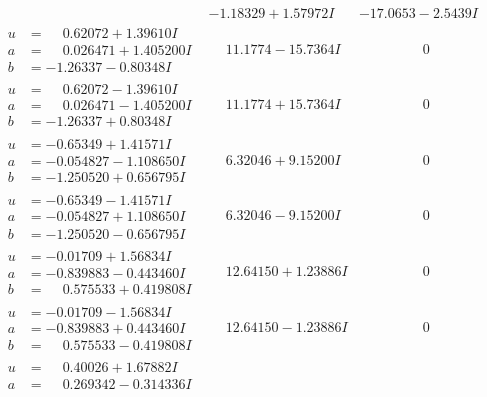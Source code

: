 \documentclass[1p]{elsarticle_modified}
\theoremstyle{definition}
\begin{document}
$$\begin{array}{c|c|c}
 & -1.18329 + 1.57972 I & -17.0653 - 2.5439 I \\ \hline\begin{aligned}
u &= \phantom{-}0.62072 + 1.39610 I \\
a &= \phantom{-}0.026471 + 1.405200 I \\
b &= -1.26337 - 0.80348 I\end{aligned}
 & \phantom{-}11.1774 - 15.7364 I & \phantom{-0.000000 } 0 \\ \hline\begin{aligned}
u &= \phantom{-}0.62072 - 1.39610 I \\
a &= \phantom{-}0.026471 - 1.405200 I \\
b &= -1.26337 + 0.80348 I\end{aligned}
 & \phantom{-}11.1774 + 15.7364 I & \phantom{-0.000000 } 0 \\ \hline\begin{aligned}
u &= -0.65349 + 1.41571 I \\
a &= -0.054827 - 1.108650 I \\
b &= -1.250520 + 0.656795 I\end{aligned}
 & \phantom{-}6.32046 + 9.15200 I & \phantom{-0.000000 } 0 \\ \hline\begin{aligned}
u &= -0.65349 - 1.41571 I \\
a &= -0.054827 + 1.108650 I \\
b &= -1.250520 - 0.656795 I\end{aligned}
 & \phantom{-}6.32046 - 9.15200 I & \phantom{-0.000000 } 0 \\ \hline\begin{aligned}
u &= -0.01709 + 1.56834 I \\
a &= -0.839883 - 0.443460 I \\
b &= \phantom{-}0.575533 + 0.419808 I\end{aligned}
 & \phantom{-}12.64150 + 1.23886 I & \phantom{-0.000000 } 0 \\ \hline\begin{aligned}
u &= -0.01709 - 1.56834 I \\
a &= -0.839883 + 0.443460 I \\
b &= \phantom{-}0.575533 - 0.419808 I\end{aligned}
 & \phantom{-}12.64150 - 1.23886 I & \phantom{-0.000000 } 0 \\ \hline\begin{aligned}
u &= \phantom{-}0.40026 + 1.67882 I \\
a &= \phantom{-}0.269342 - 0.314336 I \\

\end{aligned}
\end{array}$$
\end{document}
